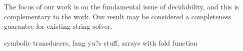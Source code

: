 

The focus of our work is on the fundamental issue of decidability, and this is complementary to the work. Our result may be considered a completeness guarantee for existing string solver. 
 
symbolic transducers, fang yu?s stuff, arrays with fold function
 
